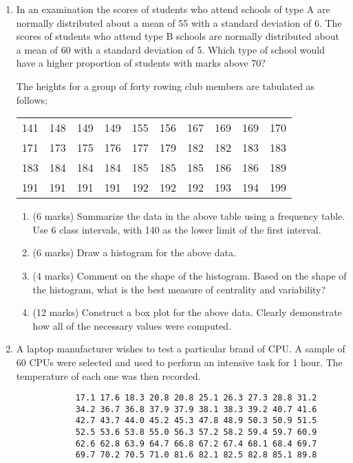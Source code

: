 \documentclass[]{report}
\begin{document}
\begin{enumerate}
\item 	In an examination the scores of students who attend schools of type A are
normally distributed about a mean of 55 with a standard deviation of 6. The
scores of students who attend type B schools are normally distributed about a
mean of 60 with a standard deviation of 5.
Which type of school would have a higher proportion of students with marks above 70?

The heights for a group of forty rowing club members are tabulated as follows;

\begin{table}[ht]
	\begin{center}
		\begin{tabular}{|rrrrrrrrrr|}
			
			\hline
			141 & 148 & 149 & 149 & 155 & 156 & 167 & 169 & 169 & 170 \\
			171 & 173 & 175 & 176 & 177 & 179 & 182 & 182 & 183 & 183 \\
			183 & 184 & 184 & 184 & 185 & 185 & 185 & 186 & 186 & 189 \\
			191 & 191 & 191 & 191 & 192 & 192 & 192 & 193 & 194 & 199 \\
			\hline
		\end{tabular}
	\end{center}
\end{table}
\vspace{-0.5cm}
\begin{enumerate}
	\item (6 marks) Summarize the data in the above table using a frequency table. Use 6 class intervals, with 140 as the lower limit of the first interval.
	\item (6 marks) Draw a histogram for the above data.
	\item (4 marks) Comment on the shape of the histogram. Based on the shape of the histogram, what is the best measure of centrality and variability?
	\item (12 marks) Construct a box plot for the above data. Clearly demonstrate how all of the necessary values were computed.
\end{enumerate}
\item
A laptop manufacturer wishes to test a particular brand of CPU. A sample of 60 CPUs were selected and used to perform an intensive task for 1 hour. The temperature of each one was then recorded.
\begin{center}
	{
		\begin{framed}
			\large
			\begin{verbatim}
			17.1 17.6 18.3 20.8 20.8 25.1 26.3 27.3 28.8 31.2
			34.2 36.7 36.8 37.9 37.9 38.1 38.3 39.2 40.7 41.6
			42.7 43.7 44.0 45.2 45.3 47.8 48.9 50.3 50.9 51.5
			52.5 53.6 53.8 55.0 56.3 57.2 58.2 59.4 59.7 60.9
			62.6 62.8 63.9 64.7 66.8 67.2 67.4 68.1 68.4 69.7
			69.7 70.2 70.5 71.0 81.6 82.1 82.5 82.8 85.1 89.8
			\end{verbatim}
		\end{framed}
	}
\end{center}


\end{enumerate}
\end{document}
